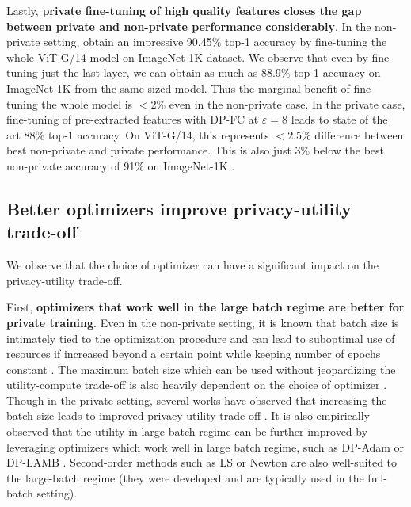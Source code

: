 \documentclass[letterpaper]{article} \usepackage{fullpage}
\renewcommand{\epsilon}{\varepsilon}
\begin{document}
Lastly, \textbf{private fine-tuning of high quality features closes the gap between private and non-private performance considerably}. In the non-private setting, \cite{zhai2021scaling} obtain an impressive 90.45\% top-1 accuracy by fine-tuning the whole ViT-G/14 model on ImageNet-1K dataset. We observe that even by fine-tuning just the last layer, we can obtain as much as 88.9\% top-1 accuracy on ImageNet-1K from the same sized model. Thus the marginal benefit of fine-tuning the whole model is $<$2\% even in the non-private case. In the private case, fine-tuning of pre-extracted features with DP-FC at $\epsilon=8$ leads to state of the art 88\% top-1 accuracy. On ViT-G/14, this represents $ <2.5\% $ difference between best non-private and private performance. This is also just 3\% below the best non-private accuracy of 91\% on ImageNet-1K \cite{yu2022coca}.



\subsection{Better optimizers improve privacy-utility trade-off}






We observe that the choice of optimizer can have a significant impact on the privacy-utility trade-off.

First, \textbf{optimizers that work well in the large batch regime are better for private training}. Even in the non-private setting, it is known that batch size is intimately tied to the optimization procedure and can lead to suboptimal use of resources if increased beyond a certain point while keeping number of epochs constant \cite{goyal2017largebatch,you2017largebatch,lamb}. The maximum batch size which can be used without jeopardizing the utility-compute trade-off is also heavily dependent on the choice of optimizer \cite{zhang2019algorithmic}. Though in the private setting, several works have observed that increasing the batch size leads to improved privacy-utility trade-off \cite{doorman_notallnoise_2021,li_large_batch,hoory_2021_llm}. It is also empirically observed that the utility in large batch regime can be further improved by leveraging optimizers which work well in large batch regime, such as DP-Adam or DP-LAMB \cite{anil21_dpbert,mehta2022large,bu2022scalable_oldsota}. Second-order methods such as LS or Newton are also well-suited to the large-batch regime (they were developed and are typically used in the full-batch setting).
\end{document}
